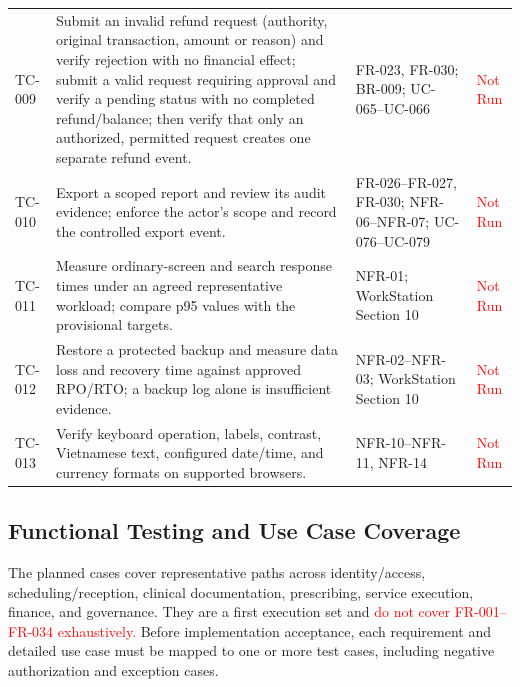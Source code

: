 \documentclass[a4paper,12pt]{article}
\newcommand{\weak}[1]{\textcolor{red}{#1}}
\begin{document}
\begin{longtable}{@{}p{}p{}p{}p{}@{}}
TC-009 & Submit an invalid refund request (authority, original transaction, amount or reason) and verify rejection with no financial effect; submit a valid request requiring approval and verify a pending status with no completed refund/balance; then verify that only an authorized, permitted request creates one separate refund event. & FR-023, FR-030; BR-009; UC-065--UC-066 & \weak{Not Run} \\
TC-010 & Export a scoped report and review its audit evidence; enforce the actor's scope and record the controlled export event. & FR-026--FR-027, FR-030; NFR-06--NFR-07; UC-076--UC-079 & \weak{Not Run} \\
TC-011 & Measure ordinary-screen and search response times under an agreed representative workload; compare p95 values with the provisional targets. & NFR-01; WorkStation Section 10 & \weak{Not Run} \\
TC-012 & Restore a protected backup and measure data loss and recovery time against approved RPO/RTO; a backup log alone is insufficient evidence. & NFR-02--NFR-03; WorkStation Section 10 & \weak{Not Run} \\
TC-013 & Verify keyboard operation, labels, contrast, Vietnamese text, configured date/time, and currency formats on supported browsers. & NFR-10--NFR-11, NFR-14 & \weak{Not Run} \\
\bottomrule
\end{longtable}
\endgroup

\subsection{Functional Testing and Use Case Coverage}
The planned cases cover representative paths across identity/access, scheduling/reception, clinical documentation, prescribing, service execution, finance, and governance. They are a first execution set and \weak{do not cover FR-001--FR-034 exhaustively.} Before implementation acceptance, each requirement and detailed use case must be mapped to one or more test cases, including negative authorization and exception cases.
\end{document}
